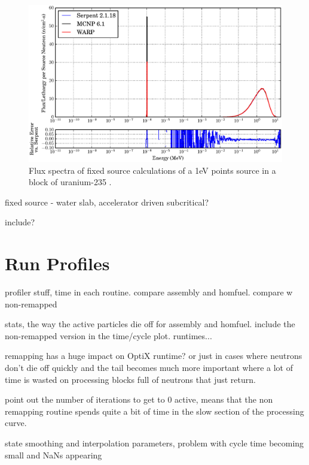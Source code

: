 \begin{figure}[h!]
\centering
\includegraphics[width=\textwidth,trim= 1cm 0cm 1cm 0cm]{graphics/finalresults/fixed_spec.eps}
\caption{Flux spectra of fixed source calculations of a 1eV points source in a block of uranium-235 . \label{fixed_spec} }
\end{figure}

fixed source - water slab, accelerator driven subcritical?

include?


\section{Run Profiles}

profiler stuff, time in each routine.  compare assembly and homfuel.  compare w non-remapped

stats, the way the active particles die off for assembly and homfuel.  include the non-remapped version in the time/cycle plot.  runtimes...

remapping has a huge impact on OptiX runtime?  or just in cases where neutrons don't die off quickly and the tail becomes much more important where a lot of time is wasted on processing blocks full of neutrons that just return.

point out the number of iterations to get to 0 active, means that the non remapping routine spends quite a bit of time in the slow section of the processing curve.

state smoothing and interpolation parameters, problem with cycle time becoming small and NaNs appearing

